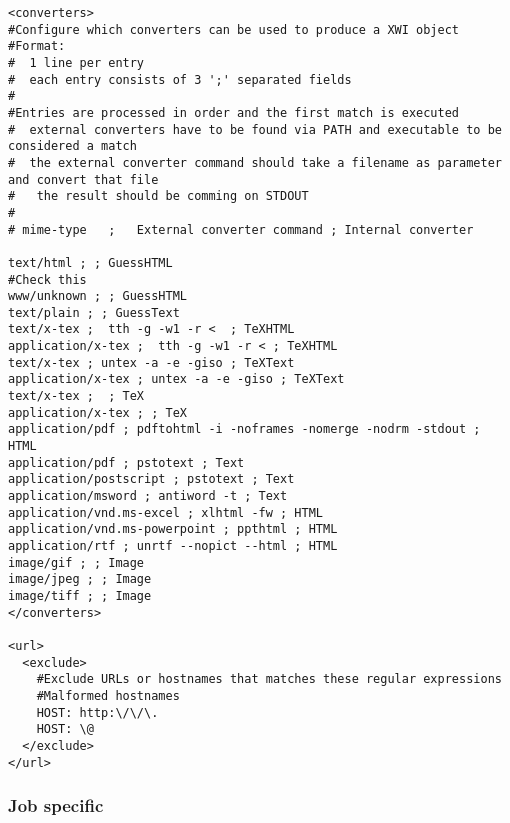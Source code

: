 \begin{verbatim}
<converters>
#Configure which converters can be used to produce a XWI object
#Format:
#  1 line per entry
#  each entry consists of 3 ';' separated fields
#
#Entries are processed in order and the first match is executed
#  external converters have to be found via PATH and executable to be considered a match
#  the external converter command should take a filename as parameter and convert that file
#   the result should be comming on STDOUT
#
# mime-type   ;   External converter command ; Internal converter

text/html ; ; GuessHTML
#Check this
www/unknown ; ; GuessHTML
text/plain ; ; GuessText
text/x-tex ;  tth -g -w1 -r <  ; TeXHTML
application/x-tex ;  tth -g -w1 -r < ; TeXHTML
text/x-tex ; untex -a -e -giso ; TeXText
application/x-tex ; untex -a -e -giso ; TeXText
text/x-tex ;  ; TeX
application/x-tex ; ; TeX
application/pdf ; pdftohtml -i -noframes -nomerge -nodrm -stdout ; HTML
application/pdf ; pstotext ; Text
application/postscript ; pstotext ; Text
application/msword ; antiword -t ; Text
application/vnd.ms-excel ; xlhtml -fw ; HTML
application/vnd.ms-powerpoint ; ppthtml ; HTML
application/rtf ; unrtf --nopict --html ; HTML
image/gif ; ; Image
image/jpeg ; ; Image
image/tiff ; ; Image
</converters>

<url>
  <exclude>
    #Exclude URLs or hostnames that matches these regular expressions
    #Malformed hostnames
    HOST: http:\/\/\.
    HOST: \@
  </exclude>
</url>
\end{verbatim}
\subsubsection{Job specific}

